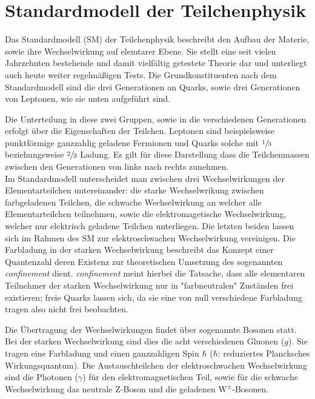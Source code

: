 \section{Standardmodell der Teilchenphysik}
%
Das Standardmodell (SM) der Teilchenphysik beschreibt den Aufbau der Materie, sowie ihre Wechselwirkung auf elemtarer Ebene. Sie stellt eine seit vielen Jahrzehnten bestehende und damit vielfältig getestete Theorie dar und unterliegt auch heute weiter regelmäßigen Tests.
Die Grundkonstituenten nach dem Standardmodell sind die drei Generationen an Quarks, sowie drei Generationen von Leptonen, wie sie unten aufgeführt sind.



Die Unterteilung in diese zwei Gruppen, sowie in die verschiedenen Generationen erfolgt über die Eigenschaften der Teilchen. Leptonen sind beispielsweise punktförmige ganzzahlig geladene Fermionen und Quarks solche mit $\sfrac{1}{3}$ beziehungsweise $\sfrac{2}{3}$ Ladung. Es gilt für diese Darstellung dass die Teilchenmassen zwischen den Generationen von links nach rechts zunehmen.\\
Im Standardmodell unterscheidet man zwischen drei Wechselwirkungen der Elementarteilchen untereinander: die starke Wechselwrikung zwischen farbgeladenen Teilchen, die schwache Wechselwirkung an welcher alle Elementarteilchen teilnehmen, sowie die elektromagetische Wechselwirkung, welcher nur elektrisch geladene Teilchen unterliegen. Die letzten beiden lassen sich im Rahmen des SM zur elektroschwachen Wechselwirkung vereinigen.
Die Farbladung in der starken Wechselwirkung beschreibt das Konzept einer Quantenzahl deren Existenz zur theoretischen Umsetzung des sogenannten \textit{confinement} dient. \textit{confinement} meint hierbei die Tatsache, dass alle elementaren Teilnehmer der starken Wechselwirkung nur in "farbneutralen" Zuständen frei existieren; freie Quarks lassen sich, da sie eine von null verschiedene Farbladung tragen also nicht frei beobachten.

Die Übertragung der Wechselwirkungen findet über sogenannte Bosonen statt. Bei der starken Wechselwirkung sind dies die acht verschiedenen Gluonen ($g$). Sie tragen eine Farbladung und einen ganzzahligen Spin $\hbar$ ($\hbar$: reduziertes Plancksches Wirkungsquantum). Die Austauschteilchen der elektroschwachen Wechselwirkung sind die Photonen ($\gamma$) für den elektromagnetischen Teil, sowie für die schwache Wechselwirkung das neutrale $\mathrm{Z}$-Boson und die geladenen $\mathrm{W^{\pm}}$-Bosonen.
